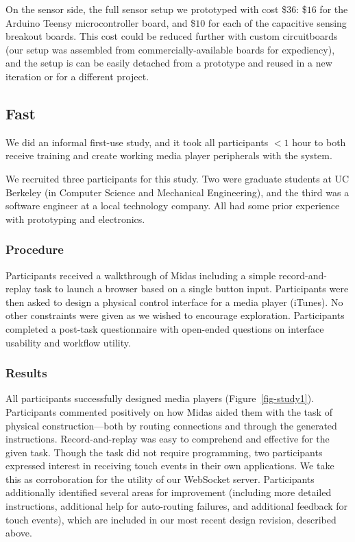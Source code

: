     On the sensor side, the full sensor setup we prototyped with cost \$$36$: \$$16$ for the Arduino Teensy microcontroller board, and \$$10$ for each of the capacitive sensing breakout boards. This cost could be reduced further with custom circuitboards (our setup was assembled from commercially-available boards for expediency), and the setup is can be easily detached from a prototype and reused in a new iteration or for a different project.
    
    \subsection{Fast}
    
    We did an informal first-use study, and it took all participants $<1$ hour to both receive training and create working media player peripherals with the system.
    
    We recruited three participants for this study. Two were graduate students at UC Berkeley (in Computer Science and Mechanical Engineering), and the third was a software engineer at a local technology company. All had some prior experience with prototyping and electronics.

        \subsubsection{Procedure}
Participants received a walkthrough of Midas including a simple record-and-replay task to launch a browser based on a single button input. Participants were then asked to design a physical control interface for a media player (iTunes). No other constraints were given as we wished to encourage exploration. Participants completed a post-task questionnaire with open-ended questions on interface usability and workflow utility.

    \subsubsection{Results}
All participants successfully designed media players (Figure~\ref{fig-study1}). Participants commented positively on how Midas aided them with the task of physical construction---both by routing connections and through the generated instructions. Record-and-replay was easy to comprehend and effective for the given task. Though the task did not require programming, two participants expressed interest in receiving touch events in their own applications. We take this as corroboration for the utility of our WebSocket server. Participants additionally identified several areas for improvement (including more detailed instructions, additional help for auto-routing failures, and additional feedback for touch events), which are included in our most recent design revision, described above.

